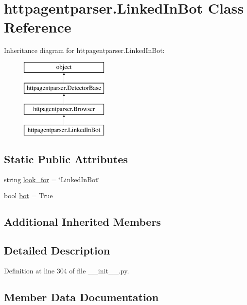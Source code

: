 \hypertarget{classhttpagentparser_1_1_linked_in_bot}{}\section{httpagentparser.\+Linked\+In\+Bot Class Reference}
\label{classhttpagentparser_1_1_linked_in_bot}
Inheritance diagram for httpagentparser.\+Linked\+In\+Bot\+:\begin{figure}[H]
\begin{center}
\leavevmode
\includegraphics[height=4.000000cm]{classhttpagentparser_1_1_linked_in_bot}
\end{center}
\end{figure}
\subsection*{Static Public Attributes}
\begin{DoxyCompactItemize}
\item 
string \hyperlink{classhttpagentparser_1_1_linked_in_bot_a71b26a2eac880bfa8038284745d0c7a2}{look\+\_\+for} = \char`\"{}Linked\+In\+Bot\char`\"{}
\item 
bool \hyperlink{classhttpagentparser_1_1_linked_in_bot_ab426a617bd129e1d192caead2fe8f9e5}{bot} = True
\end{DoxyCompactItemize}
\subsection*{Additional Inherited Members}


\subsection{Detailed Description}


Definition at line 304 of file \+\_\+\+\_\+init\+\_\+\+\_\+.\+py.



\subsection{Member Data Documentation}
\hypertarget{classhttpagentparser_1_1_linked_in_bot_ab426a617bd129e1d192caead2fe8f9e5}{}\label{classhttpagentparser_1_1_linked_in_bot_ab426a617bd129e1d192caead2fe8f9e5} 
